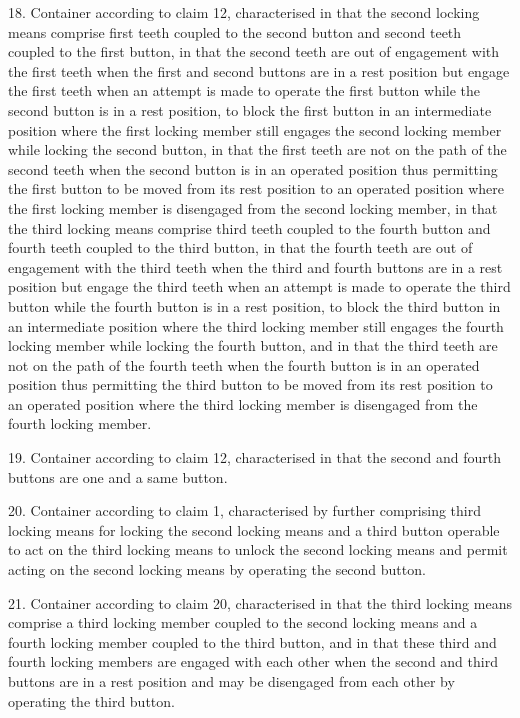 \documentclass[11pt,a4paper]{article}
\begin{document}
18. Container according to claim 12, characterised in that the second locking means comprise first teeth coupled to the second button and second teeth coupled to the first button, in that the second teeth are out of engagement with the first teeth when the first and second buttons are in a rest position but engage the first teeth when an attempt is made to operate the first button while the second button is in a rest position, to block the first button in an intermediate position where the first locking member still engages the second locking member while locking the second button, in that the first teeth are not on the path of the second teeth when the second button is in an operated position thus permitting the first button to be moved from its rest position to an operated position where the first locking member is disengaged from the second locking member, in that the third locking means comprise third teeth coupled to the fourth button and fourth teeth coupled to the third button, in that the fourth teeth are out of engagement with the third teeth when the third and fourth buttons are in a rest position but engage the third teeth when an attempt is made to operate the third button while the fourth button is in a rest position, to block the third button in an intermediate position where the third locking member still engages the fourth locking member while locking the fourth button, and in that the third teeth are not on the path of the fourth teeth when the fourth button is in an operated position thus permitting the third button to be moved from its rest position to an operated position where the third locking member is disengaged from the fourth locking member.

19. Container according to claim 12, characterised in that the second and fourth buttons are one and a same button.

20. Container according to claim 1, characterised by further comprising third locking means for locking the second locking means and a third button operable to act on the third locking means to unlock the second locking means and permit acting on the second locking means by operating the second button.

21. Container according to claim 20, characterised in that the third locking means comprise a third locking member coupled to the second locking means and a fourth locking member coupled to the third button, and in that these third and fourth locking members are engaged with each other when the second and third buttons are in a rest position and may be disengaged from each other by operating the third button.
\end{document}
